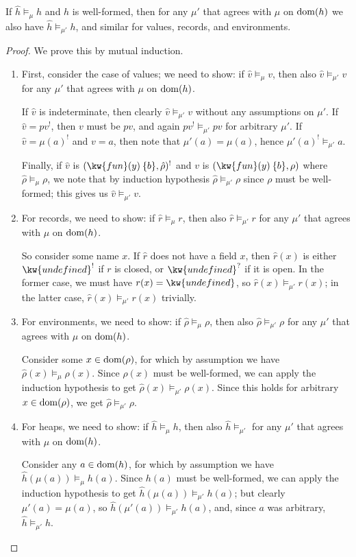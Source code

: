\documentclass{article}
\begin{document}
\begin{lemma}\label{lem:extend-agree}
If $\hat{h}\models_{\mu}h$ and $h$ is well-formed, then for any $\mu'$ that agrees with $\mu$ on $\operatorname{dom}(h)$ we also have $\hat{h}\models_{\mu'}h$, and similar for values, records, and environments.
\end{lemma}
\begin{proof}
We prove this by mutual induction.

\begin{enumerate}
\item First, consider the case of values; we need to show: if $\hat{v}\models_{\mu}v$, then also $\hat{v}\models_{\mu'}v$ for any $\mu'$ that agrees with $\mu$ on $\operatorname{dom}(h)$.

If $\hat{v}$ is indeterminate, then clearly $\hat{v}\models_{\mu'}v$ without any assumptions on $\mu'$. If $\hat{v}=\mathit{pv}^!$, then $v$ must be $\mathit{pv}$, and again $\mathit{pv}^!\models_{\mu'}\mathit{pv}$ for arbitrary $\mu'$. If $\hat{v}=\mu(a)^!$ and $v=a$, then note that $\mu'(a)=\mu(a)$, hence $\mu'(a)^!\models_{\mu'}a$.

Finally, if $\hat{v}$ is $(\kw{fun}(y)\>\{b\},\hat{\rho})^!$ and $v$ is $(\kw{fun}(y)\>\{b\},\rho)$ where $\hat{\rho}\models_{\mu}\rho$, we note that by induction hypothesis $\hat{\rho}\models_{\mu'}\rho$ since $\rho$ must be well-formed; this gives us $\hat{v}\models_{\mu'}v$.

\item For records, we need to show: if $\hat{r}\models_{\mu}r$, then also $\hat{r}\models_{\mu'}r$ for any $\mu'$ that agrees with $\mu$ on $\operatorname{dom}(h)$.

  So consider some name $x$. If $\hat{r}$ does not have a field $x$, then $\hat{r}(x)$ is either $\kw{undefined}^!$ if $r$ is closed, or $\kw{undefined}^?$ if it is open. In the former case, we must have $r(x)=\kw{undefined}$, so $\hat{r}(x)\models_{\mu'}r(x)$; in the latter case, $\hat{r}(x)\models_{\mu'}r(x)$ trivially.

\item For environments, we need to show: if $\hat{\rho}\models_{\mu}\rho$, then also $\hat{\rho}\models_{\mu'}\rho$ for any $\mu'$ that agrees with $\mu$ on $\operatorname{dom}(h)$.

  Consider some $x\in\operatorname{dom}(\rho)$, for which by assumption we have $\hat{\rho}(x)\models_{\mu}\rho(x)$. Since $\rho(x)$ must be well-formed, we can apply the induction hypothesis to get $\hat{\rho}(x)\models_{\mu'}\rho(x)$. Since this holds for arbitrary $x\in\operatorname{dom}(\rho)$, we get $\hat{\rho}\models_{\mu'}\rho$.

\item For heaps, we need to show: if $\hat{h}\models_{\mu}h$, then also $\hat{h}\models_{\mu'}$ for any $\mu'$ that agrees with $\mu$ on $\operatorname{dom}(h)$.

  Consider any $a\in\operatorname{dom}(h)$, for which by assumption we have $\hat{h}(\mu(a))\models_{\mu} h(a)$. Since $h(a)$ must be well-formed, we can apply the induction hypothesis to get $\hat{h}(\mu(a))\models_{\mu'} h(a)$; but clearly $\mu'(a)=\mu(a)$, so $\hat{h}(\mu'(a))\models_{\mu'} h(a)$, and, since $a$ was arbitrary, $\hat{h}\models_{\mu'}h$.
\end{enumerate}
\end{proof}
\end{document}

